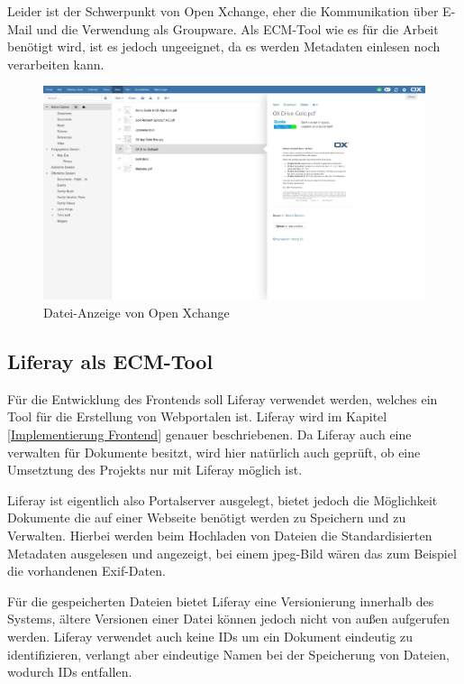 Leider ist der Schwerpunkt von Open Xchange, eher die Kommunikation \"uber E-Mail und die Verwendung als Groupware. Als \ac{ECM}-Tool wie es f\"ur die Arbeit ben\"otigt wird, ist es jedoch ungeeignet, da es werden Metadaten einlesen noch verarbeiten kann.

\begin{figure}[!ht]
\centering
\includegraphics[width=16cm]{Bilder/xchange_Oberflaeche.jpg}
\caption{Datei-Anzeige von Open Xchange}
\label{Xchange Dateianzeige}
\centering
\end{figure}

\FloatBarrier
\subsection{Liferay als ECM-Tool}
F\"ur die Entwicklung des Frontends soll Liferay verwendet werden, welches ein Tool f\"ur die Erstellung von Webportalen ist.
Liferay wird im Kapitel \ref{Implementierung Frontend} genauer beschriebenen.
Da Liferay auch eine verwalten f\"ur Dokumente besitzt, wird hier nat\"urlich auch gepr\"uft, ob eine Umsetztung des Projekts nur mit Liferay m\"oglich ist.

Liferay ist eigentlich also Portalserver ausgelegt, bietet jedoch die M\"oglichkeit Dokumente die auf einer Webseite ben\"otigt werden zu Speichern und zu Verwalten. Hierbei werden beim Hochladen von Dateien die Standardisierten Metadaten ausgelesen und angezeigt, bei einem jpeg-Bild w\"aren das zum Beispiel die vorhandenen \ac{Exif}-Daten.

F\"ur die gespeicherten Dateien bietet Liferay eine Versionierung innerhalb des Systems, \"altere Versionen einer Datei k\"onnen jedoch nicht von au\ss{}en aufgerufen werden. Liferay verwendet auch keine IDs um ein Dokument eindeutig zu identifizieren, verlangt aber eindeutige Namen bei der Speicherung von Dateien, wodurch IDs entfallen.

